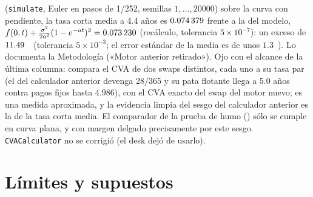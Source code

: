 \begin{sloppypar}
(\texttt{simulate}, Euler en pasos de 1/252, semillas $1,\dots,20000$) sobre la curva con pendiente, la tasa corta media
a 4.4 años es $\verif{cap14-legacy-tasa-simulada}{0.074379}$ frente a la del modelo,
$f(0,t)+\tfrac{\sigma^{2}}{2a^{2}}(1-e^{-at})^{2}=\verif{cap14-legacy-tasa-modelo}{0.073230}$ (recálculo, tolerancia $5\times10^{-7}$): un
exceso de $\verif{cap14-legacy-tasa-sesgo-pb}{11.49}$~\pb\ (tolerancia $5\times10^{-3}$; el error estándar de la
media es de unos $1.3$~\pb). Lo documenta la Metodología («Motor anterior retirado»). Ojo con el alcance de la última columna: compara el CVA de dos
swaps distintos, cada uno a su tasa par (el del calculador anterior devenga 28/365 y su pata flotante llega a 5.0 años contra pagos
fijos hasta 4.986), con el CVA exacto del swap del motor nuevo; es una medida aproximada, y la evidencia limpia del sesgo del
calculador anterior es la de la tasa corta media. El comparador de la prueba de
humo () sólo se cumple en
curva plana, y con margen delgado precisamente por este sesgo. \texttt{CVACalculator} no se corrigió (el desk dejó de usarlo).
\end{sloppypar}

\section{Límites y supuestos}\label{sec:cap14-limites}

